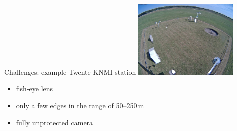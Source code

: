 \documentclass[10pt,fleqn]{beamer}\usepackage[]{graphicx}\usepackage[]{color}
\begin{document}

\begin{frame}{Challenges: example Twente KNMI station}\centering
 \includegraphics[width=5cm]{EHTW_201508231400.jpg}
 \begin{itemize}
  \item fish-eye lens
  \item only a few edges in the range of 50--250\,m
  \item fully unprotected camera
 \end{itemize}
\end{frame}
\end{document}
